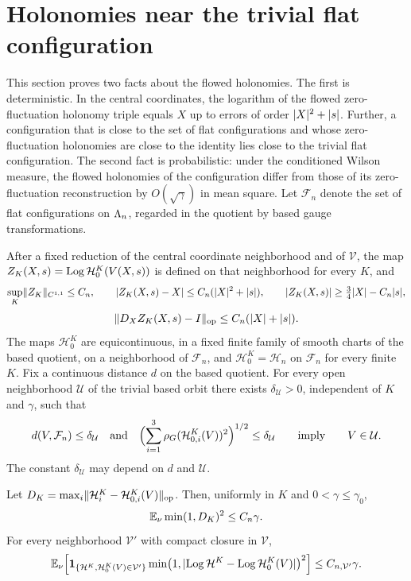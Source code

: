 \section{Holonomies near the trivial flat configuration}\label{ch32:sec:holonomy}

This section proves two facts about the flowed holonomies. The first is deterministic. In the central coordinates, the logarithm of the flowed zero-fluctuation holonomy triple equals $X$ up to errors of order $\lvert X\rvert^2+\lvert s\rvert$. Further, a configuration that is close to the set of flat configurations and whose zero-fluctuation holonomies are close to the identity lies close to the trivial flat configuration. The second fact is probabilistic: under the conditioned Wilson measure, the flowed holonomies of the configuration differ from those of its zero-fluctuation reconstruction by $O(\sqrt\gamma)$ in mean square. Let $\mathcal F_n$ denote the set of flat configurations on $\Lambda_{n}$, regarded in the quotient by based gauge transformations.

\begin{theorem}\label{ch32:thm:central-matrix-transfer}
After a fixed reduction of the central coordinate neighborhood and of $\mathcal V$, the map $Z_K(X,s)=\operatorname{Log}\mathcal H_0^K(V(X,s))$ is defined on that neighborhood for every $K$, and
\[
 \sup_K\lVert Z_K\rVert_{C^{1,1}}\le C_n,\qquad
 \lvert Z_K(X,s)-X\rvert\le C_n(\lvert X\rvert^2+\lvert s\rvert),\qquad
 \lvert Z_K(X,s)\rvert\ge\tfrac34\lvert X\rvert-C_n\lvert s\rvert,
\]
\[
 \lVert D_XZ_K(X,s)-I\rVert_{\mathrm{op}}\le C_n(\lvert X\rvert+\lvert s\rvert).
\]
The maps $\mathcal H_0^K$ are equicontinuous, in a fixed finite family of smooth charts of the based quotient, on a neighborhood of $\mathcal F_n$, and $\mathcal H^K_0=\mathcal H_n$ on $\mathcal F_n$ for every finite $K$. Fix a continuous distance $d$ on the based quotient. For every open neighborhood $\mathcal U$ of the trivial based orbit there exists $\delta_{\mathcal U}>0$, independent of $K$ and $\gamma$, such that
\[
 d(V,\mathcal F_n)\le\delta_{\mathcal U}\quad\text{and}\quad
 \Bigl(\sum_{i=1}^3\rho_G(\mathcal H^K_{0,i}(V))^2\Bigr)^{1/2}\le\delta_{\mathcal U}
 \qquad\text{imply}\qquad V\in\mathcal U.
\]
The constant $\delta_{\mathcal U}$ may depend on $d$ and $\mathcal U$.

Let $D_K=\max_i\lVert \mathcal H^K_i-\mathcal H^K_{0,i}(V)\rVert_{\mathrm{op}}$. Then, uniformly in $K$ and $0<\gamma\le\gamma_0$,
\[
 \mathbb E_\nu\min(1,D_K)^2\le C_n\gamma.
\]
For every neighborhood $\mathcal V'$ with compact closure in $\mathcal V$,
\[
 \mathbb E_\nu\Bigl[\mathbf 1_{\{\mathcal H^K,\mathcal H^K_0(V)\in\mathcal V'\}}\min\bigl(1,\lvert \operatorname{Log}\mathcal H^K-\operatorname{Log}\mathcal H^K_0(V)\rvert\bigr)^2\Bigr]\le C_{n,\mathcal V'}\gamma.
\]
\end{theorem}

